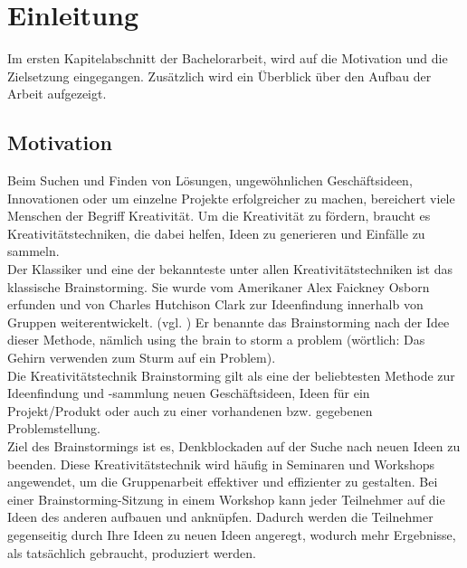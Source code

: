 \chapter{Einleitung}
\label{sec:einleitung}
Im ersten Kapitelabschnitt der Bachelorarbeit, wird auf die Motivation und die Zielsetzung eingegangen. Zusätzlich wird ein Überblick über den Aufbau der Arbeit aufgezeigt.

\section{Motivation}
\label{sec:motivation}
Beim Suchen und Finden von Lösungen, ungewöhnlichen Geschäftsideen, Innovationen oder um einzelne Projekte erfolgreicher zu machen, bereichert viele Menschen der Begriff Kreativität. Um die Kreativität zu fördern, braucht es Kreativitätstechniken, die dabei helfen, Ideen zu generieren und Einfälle zu sammeln.
\\

Der Klassiker und eine der bekannteste unter allen Kreativitätstechniken ist das klassische Brainstorming. Sie wurde vom Amerikaner Alex Faickney Osborn erfunden und von Charles Hutchison Clark zur Ideenfindung innerhalb von Gruppen weiterentwickelt. 
(vgl. \cite{Ben.o.J.}) \glqq Er benannte das Brainstorming nach der Idee dieser Methode, nämlich using the brain to storm a problem (wörtlich: Das Gehirn verwenden zum Sturm auf ein Problem).\grqq{} \cite{Pas2012} 
\\

Die Kreativitätstechnik Brainstorming gilt als eine der beliebtesten Methode zur Ideenfindung und -sammlung neuen Geschäftsideen, Ideen für ein Projekt/Produkt oder auch zu einer vorhandenen bzw. gegebenen Problemstellung.
\\

Ziel des Brainstormings ist es, Denkblockaden auf der Suche nach neuen Ideen zu beenden. Diese Kreativitätstechnik wird häufig in Seminaren und Workshops angewendet, um die Gruppenarbeit effektiver und effizienter zu gestalten. Bei einer Brainstorming-Sitzung in einem Workshop kann jeder Teilnehmer auf die Ideen des anderen aufbauen und anknüpfen. Dadurch werden die Teilnehmer gegenseitig durch Ihre Ideen zu neuen Ideen angeregt, wodurch mehr Ergebnisse, als tatsächlich gebraucht, produziert werden. 
\\

